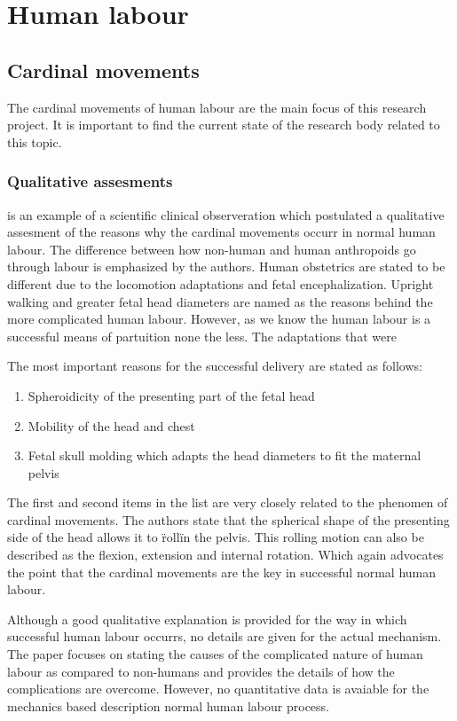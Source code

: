 \section{Human labour}

\subsection{Cardinal movements}

  The cardinal movements of human labour are the main focus of this research project. It is important to find the current state of the research body related to this topic.

  \subsubsection{Qualitative assesments}

  \citep{abitbol1993} is an example of a scientific clinical observeration which postulated a qualitative assesment of the reasons why the cardinal movements occurr in normal human labour. The difference between how non-human and human anthropoids go through labour is emphasized by the authors. Human obstetrics are stated to be different due to the locomotion adaptations and fetal encephalization. Upright walking and greater fetal head diameters are named as the reasons behind the more complicated human labour. However, as we know the human labour is a successful means of partuition none the less. The adaptations that were

  The most important reasons for the successful delivery are stated as follows:

  \begin{enumerate}

    \item Spheroidicity of the presenting part of the fetal head
    \item Mobility of the head and chest
    \item Fetal skull molding which adapts the head diameters to fit the maternal pelvis

  \end{enumerate}

  The first and second items in the list are very closely related to the phenomen of cardinal movements. The authors state that the spherical shape of the presenting side of the head allows it to \"roll\" in the pelvis. This rolling motion can also be described as the flexion, extension and internal rotation. Which again advocates the point that the cardinal movements are the key in successful normal human labour.

  Although a good qualitative explanation is provided for the way in which successful human labour occurrs, no details are given for the actual mechanism. The paper focuses on stating the causes of the complicated nature of human labour as compared to non-humans and provides the details of how the complications are overcome. However, no quantitative data is avaiable for the mechanics based description normal human labour process.

